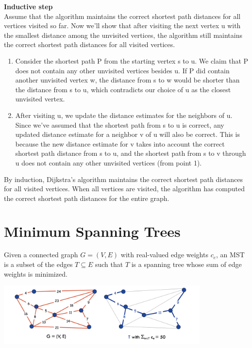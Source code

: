 \documentclass[12pt]{article}
\newcommand{\1}{\space \quad}
\newcommand{\2}{\quad \quad \quad}
\newcommand{\3}{\quad \quad \quad \quad \space}
\newcommand{\4}{\quad \quad \quad \quad \quad \quad}
\newcommand{\5}{\quad \quad \quad \quad \quad \quad \quad \space}
\begin{document}
\vspace{10pt}
\textbf{Inductive step}\\
Assume that the algorithm maintains the correct shortest path distances for all vertices visited so far. Now 
we'll show that after visiting the next vertex u with the smallest distance among the unvisited vertices, 
the algorithm still maintains the correct shortest path distances for all visited vertices.
\begin{enumerate}
  \item Consider the shortest path P from the starting vertex s to u. We claim that P does not contain any other 
  unvisited vertices besides u. If P did contain another unvisited vertex w, the distance from s to w would be 
  shorter than the distance from s to u, which contradicts our choice of u as the closest unvisited vertex.
  \item After visiting u, we update the distance estimates for the neighbors of u. Since we've assumed that the 
  shortest path from s to u is correct, any updated distance estimate for a neighbor v of u will also be correct.
  This is because the new distance estimate for v takes into account the correct shortest path distance from s to u, 
  and the shortest path from s to v through u does not contain any other unvisited vertices (from point 1).
\end{enumerate}
By induction, Dijkstra's algorithm maintains the correct shortest path distances for all visited vertices. 
When all vertices are visited, the algorithm has computed the correct shortest path distances for the entire 
graph.

\section{Minimum Spanning Trees}
Given a connected graph $G = (V, E)$ with real-valued edge weights $c_e$, an MST is a subset of the 
edges $T \subseteq E$ such that $T$ is a spanning tree whose sum of edge weights is minimized.
\begin{center}
  \includegraphics[width=0.8\textwidth]{image21.png}
\end{center}
\end{document}
